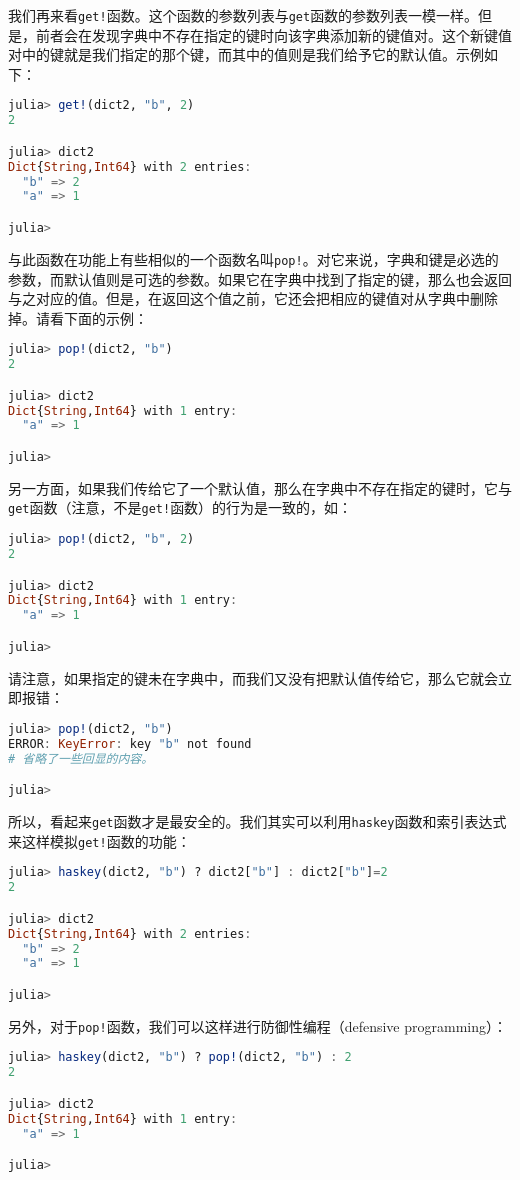 我们再来看\verb|get!|函数。这个函数的参数列表与\verb|get|函数的参数列表一模一样。但是，前者会在发现字典中不存在指定的键时向该字典添加新的键值对。这个新键值对中的键就是我们指定的那个键，而其中的值则是我们给予它的默认值。示例如下：
\begin{lstlisting}[language=julia]
julia> get!(dict2, "b", 2)
2

julia> dict2
Dict{String,Int64} with 2 entries:
  "b" => 2
  "a" => 1

julia> 
\end{lstlisting}

与此函数在功能上有些相似的一个函数名叫\verb|pop!|。对它来说，字典和键是必选的参数，而默认值则是可选的参数。如果它在字典中找到了指定的键，那么也会返回与之对应的值。但是，在返回这个值之前，它还会把相应的键值对从字典中删除掉。请看下面的示例：
\begin{lstlisting}[language=julia]
julia> pop!(dict2, "b")
2

julia> dict2
Dict{String,Int64} with 1 entry:
  "a" => 1

julia> 
\end{lstlisting}

另一方面，如果我们传给它了一个默认值，那么在字典中不存在指定的键时，它与\verb|get|函数（注意，不是\verb|get!|函数）的行为是一致的，如：
\begin{lstlisting}[language=julia]
julia> pop!(dict2, "b", 2)
2

julia> dict2
Dict{String,Int64} with 1 entry:
  "a" => 1

julia> 
\end{lstlisting}

请注意，如果指定的键未在字典中，而我们又没有把默认值传给它，那么它就会立即报错：
\begin{lstlisting}[language=julia]
julia> pop!(dict2, "b")
ERROR: KeyError: key "b" not found
# 省略了一些回显的内容。

julia> 
\end{lstlisting}

所以，看起来\verb|get|函数才是最安全的。我们其实可以利用\verb|haskey|函数和索引表达式来这样模拟\verb|get!|函数的功能：
\begin{lstlisting}[language=julia]
julia> haskey(dict2, "b") ? dict2["b"] : dict2["b"]=2
2

julia> dict2
Dict{String,Int64} with 2 entries:
  "b" => 2
  "a" => 1

julia> 
\end{lstlisting}

另外，对于\verb|pop!|函数，我们可以这样进行防御性编程（defensive programming）：
\begin{lstlisting}[language=julia]
julia> haskey(dict2, "b") ? pop!(dict2, "b") : 2
2

julia> dict2
Dict{String,Int64} with 1 entry:
  "a" => 1

julia> 
\end{lstlisting}


